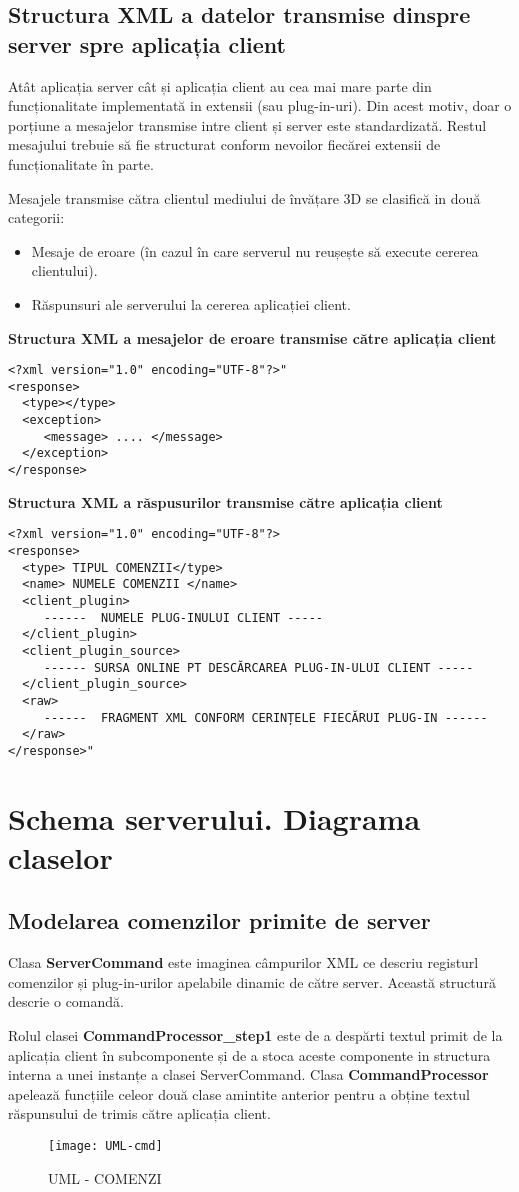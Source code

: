 \subsection{Structura XML a datelor transmise dinspre server spre aplicația client}
\par Atât aplicația server cât și aplicația client au cea mai mare parte din funcționalitate implementată in extensii (sau plug-in-uri). Din acest motiv, doar o porțiune a mesajelor transmise intre client și server este standardizată. Restul mesajului trebuie să fie structurat conform nevoilor fiecărei extensii de funcționalitate în parte.
\par Mesajele transmise cătra clientul mediului de învățare 3D se clasifică in două categorii:
\begin{itemize}
\item Mesaje de eroare (în cazul în care serverul nu reușește să execute cererea clientului).
\item Răspunsuri ale serverului la cererea aplicației client.
\end{itemize}
\textbf{Structura XML a mesajelor de eroare transmise către aplicația client}
\begin{verbatim}
<?xml version="1.0" encoding="UTF-8"?>"
<response>
  <type></type>
  <exception>
     <message> .... </message>
  </exception>
</response>
\end{verbatim}
\textbf{Structura XML a răspusurilor transmise către aplicația client}
\begin{verbatim}
<?xml version="1.0" encoding="UTF-8"?>
<response>
  <type> TIPUL COMENZII</type>
  <name> NUMELE COMENZII </name>  
  <client_plugin> 
     ------  NUMELE PLUG-INULUI CLIENT -----
  </client_plugin>
  <client_plugin_source> 
     ------ SURSA ONLINE PT DESCĂRCAREA PLUG-IN-ULUI CLIENT -----
  </client_plugin_source>
  <raw>
     ------  FRAGMENT XML CONFORM CERINȚELE FIECĂRUI PLUG-IN ------
  </raw>
</response>"
\end{verbatim}

\section{Schema serverului. Diagrama claselor }
\subsection{Modelarea comenzilor primite de server}
\par Clasa \textbf{ServerCommand} este imaginea câmpurilor XML ce descriu registurl comenzilor și plug-in-urilor apelabile dinamic de către server. Această structură descrie o comandă.
\par Rolul clasei \textbf{CommandProcessor\_step1} este de a despărti textul primit de la aplicația client în subcomponente și de a stoca aceste componente in structura interna a unei instanțe a clasei ServerCommand. Clasa \textbf{CommandProcessor} apelează funcțiile celeor două clase amintite anterior pentru a obține textul răspunsului de trimis către aplicația client.

\begin{figure}[h]
    \centering
    \texttt{[image: UML-cmd]}
    \caption{UML - COMENZI}
    \label{fig:imag7}
\end{figure}